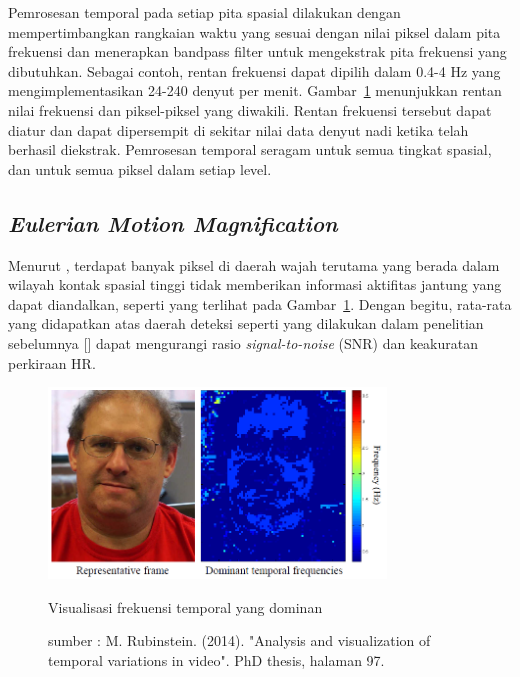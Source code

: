 Pemrosesan temporal pada setiap pita spasial dilakukan dengan mempertimbangkan rangkaian waktu yang sesuai dengan nilai piksel dalam pita frekuensi dan menerapkan bandpass filter untuk mengekstrak pita frekuensi yang dibutuhkan. Sebagai contoh, rentan frekuensi dapat dipilih dalam 0.4-4 Hz yang mengimplementasikan 24-240 denyut per menit. Gambar~\ref{fig:compare} menunjukkan rentan nilai frekuensi dan piksel-piksel yang diwakili. Rentan frekuensi tersebut dapat diatur dan dapat dipersempit di sekitar nilai data denyut nadi ketika telah berhasil diekstrak. Pemrosesan temporal seragam untuk semua tingkat spasial, dan untuk semua piksel dalam setiap level.


\subsection{\textit{Eulerian Motion Magnification}} \label{ssec:EMM}
Menurut \citet{RubinsteinPhDThesis2014}, terdapat banyak piksel di daerah wajah terutama yang berada dalam wilayah kontak spasial tinggi tidak memberikan informasi aktifitas jantung yang dapat diandalkan, seperti yang terlihat pada Gambar~\ref{fig:compare}. Dengan begitu, rata-rata yang didapatkan atas daerah deteksi seperti yang dilakukan dalam penelitian sebelumnya [\citet{Poh2010,Poh2011}] dapat mengurangi rasio \textit{signal-to-noise} (SNR) dan keakuratan perkiraan HR.


\begin{figure}[ht]
\vspace{0.5em}
\centering
 \includegraphics[width=0.8\textwidth]{Compare}
 \caption{Visualisasi frekuensi temporal yang dominan}
  \caption*{sumber : M. Rubinstein. (2014). "Analysis and visualization of temporal variations in video". PhD thesis, halaman 97.}
 \label{fig:compare}   
\end{figure}

